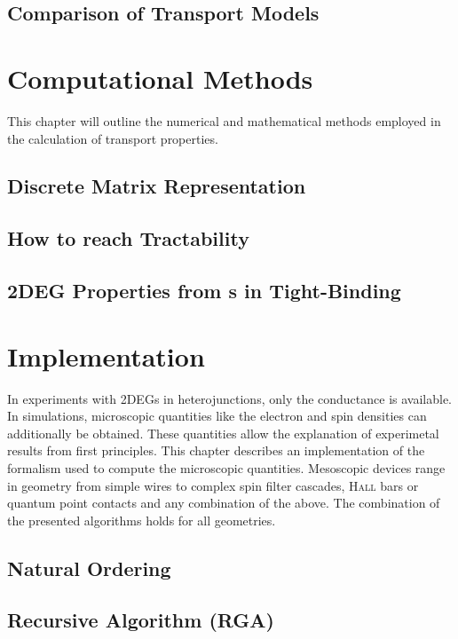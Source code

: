   \section{Comparison of Transport Models}
  
\chapter{Computational Methods}
This chapter will outline the numerical and mathematical methods employed in the calculation of transport properties.
  \section{Discrete Matrix Representation}\label{sec:discretematrixrep}
  
  \section{How to reach Tractability}\label{sec:tractability}
  
  \section{2DEG Properties from \cgfnc s in Tight-Binding}\label{sec:observables}
  
\chapter{Implementation}
In experiments with 2DEGs in heterojunctions, only the conductance is available. In simulations, microscopic quantities like the electron and spin densities can additionally be obtained. These quantities allow the explanation of experimetal results from first principles. This chapter describes an implementation of the \gfnc{} formalism used to compute the microscopic quantities.
Mesoscopic devices range in geometry from simple wires to complex spin filter cascades, \textsc{Hall} bars or quantum point contacts and any combination of the above. The combination of the presented algorithms holds for all geometries.
\section{Natural Ordering}\label{sec:naruralordering}

\section{Recursive \cgfnc{} Algorithm (RGA)} \label{sec:recursivegreenfncalgorithm}

